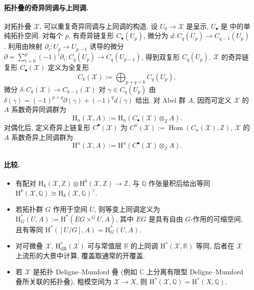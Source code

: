 \paragraph{拓扑叠的奇异同调与上同调.}
对拓扑叠 $\mathcal X$, 可以重复奇异同调与上同调的构造. 设 $U_0\to\mathcal X$ 是呈示, $U_\bullet$ 是  中的单纯拓扑空间. 对每个 $p$, 有奇异链复形 $C_\bullet(U_p)$, 微分为 $d:C_q(U_p)\to C_{q-1}(U_p)$. 利用由映射 $\partial_i:U_p\to U_{p-1}$ 诱导的微分 $\partial=\sum_{i=0}^p(-1)^i\partial_i:C_q(U_p)\to C_q(U_{p-1})$, 得到双复形 $C_q(U_p)$. $\mathcal X$ 的奇异链复形 $C_\bullet(\mathcal X)$ 定义为全复形
\[
C_k(\mathcal X):=\bigoplus_{p+q=k}C_q(U_p),
\]
微分 $\delta:C_k(\mathcal X)\to C_{k-1}(\mathcal X)$ 对 $\gamma\in C_q(U_p)$ 由 $\delta(\gamma)=(-1)^{p+q}\partial(\gamma)+(-1)^qd(\gamma)$ 给出. 对 Abel 群 $A$, 因而可定义 $\mathcal X$ 的 $A$ 系数奇异同调群为
\[
\mathrm H_n(\mathcal X,A):=\mathrm H_n(C_\bullet(\mathcal X)\otimes_{\mathbb Z}A).
\]
对偶化后, 定义奇异上链复形 $C^{\bullet}(\mathcal X)$ 为 $C^n(\mathcal X):=\operatorname{Hom}(C_n(\mathcal X),\mathbb Z)$, $\mathcal X$ 的 $A$ 系数奇异上同调群为
\[
\mathrm H^n(\mathcal X,A):=\mathrm H^n(C^{\bullet}(\mathcal X)\otimes_{\mathbb Z}A).
\]
\paragraph{比较.}
\begin{itemize}
\item 有配对 $\mathrm H_k(\mathcal X,\mathbb Z)\otimes\mathrm H^k(\mathcal X,\mathbb Z)\to\mathbb Z$, 与 $\mathbb Q$ 作张量积后给出等同 $\mathrm H^k(\mathcal X,\mathbb Q)\cong\mathrm H_k(\mathcal X,\mathbb Q)^{\vee}$.
\item 若拓扑群 $G$ 作用于空间 $U$, 则等变上同调定义为 $\mathrm H_G^*(U,A):=\mathrm H^*(EG\times^G U,A)$, 其中 $EG$ 是具有自由 $G$-作用的可缩空间, 且有等同 $\mathrm H^*([U/G],A)=\mathrm H_G^*(U,A)$.
\item 对可微叠 $\mathcal X$, $\mathrm H_{\mathrm{dR}}^*(\mathcal X)$ 可与常值层 $\mathbb R$ 的上同调 $\mathrm H^*(\mathcal X,\mathbb R)$ 等同, 后者在 $\mathcal X$ 上流形的大景中计算, 覆盖取通常的开覆盖.
\item 若 $\mathcal X$ 是拓扑 Deligne--Mumford 叠 (例如 $\mathbb C$ 上分离有限型 Deligne--Mumford 叠所关联的拓扑叠), 粗模空间为 $\mathcal X\to X$, 则 $\mathrm H^*(\mathcal X,\mathbb Q)=\mathrm H^*(X,\mathbb Q)$.
\end{itemize}
